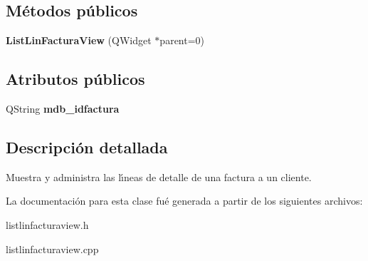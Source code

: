\subsection*{M\'{e}todos p\'{u}blicos}
\begin{CompactItemize}
\item 
{\bf List\-Lin\-Factura\-View} (QWidget $\ast$parent=0)\label{classListLinFacturaView_a0}

\end{CompactItemize}
\subsection*{Atributos p\'{u}blicos}
\begin{CompactItemize}
\item 
QString {\bf mdb\_\-idfactura}\label{classListLinFacturaView_o0}

\end{CompactItemize}


\subsection{Descripci\'{o}n detallada}
Muestra y administra las l\'{\i}neas de detalle de una factura a un cliente. 



La documentaci\'{o}n para esta clase fu\'{e} generada a partir de los siguientes archivos:\begin{CompactItemize}
\item 
listlinfacturaview.h\item 
listlinfacturaview.cpp\end{CompactItemize}
